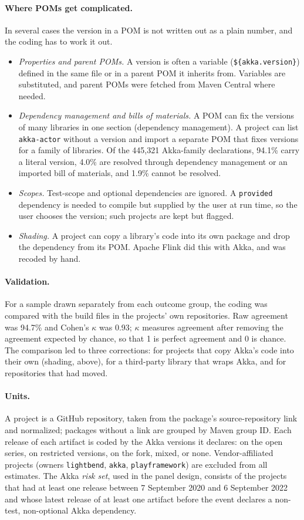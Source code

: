 \documentclass[11pt]{article}
\begin{document}
\paragraph{Where POMs get complicated.} In several cases the version in a POM is not written out as a plain number, and the coding has to work it out.
\begin{itemize}\itemsep1pt
\item \emph{Properties and parent POMs.} A version is often a variable (\texttt{\$\{akka.version\}}) defined in the same file or in a parent POM it inherits from. Variables are substituted, and parent POMs were fetched from Maven Central where needed.
\item \emph{Dependency management and bills of materials.} A POM can fix the versions of many libraries in one section (dependency management). A project can list \texttt{akka-actor} without a version and import a separate POM that fixes versions for a family of libraries. Of the 445,321 Akka-family declarations, 94.1\% carry a literal version, 4.0\% are resolved through dependency management or an imported bill of materials, and 1.9\% cannot be resolved.
\item \emph{Scopes.} Test-scope and optional dependencies are ignored. A \texttt{provided} dependency is needed to compile but supplied by the user at run time, so the user chooses the version; such projects are kept but flagged.
\item \emph{Shading.} A project can copy a library's code into its own package and drop the dependency from its POM. Apache Flink did this with Akka, and was recoded by hand.
\end{itemize}

\paragraph{Validation.} For a sample drawn separately from each outcome group, the coding was compared with the build files in the projects' own repositories. Raw agreement was 94.7\% and Cohen's $\kappa$ was 0.93; $\kappa$ measures agreement after removing the agreement expected by chance, so that 1 is perfect agreement and 0 is chance. The comparison led to three corrections: for projects that copy Akka's code into their own (shading, above), for a third-party library that wraps Akka, and for repositories that had moved.

\paragraph{Units.} A project is a GitHub repository, taken from the package's source-repository link and normalized; packages without a link are grouped by Maven group ID. Each release of each artifact is coded by the Akka versions it declares: on the open series, on restricted versions, on the fork, mixed, or none. Vendor-affiliated projects (owners \texttt{lightbend}, \texttt{akka}, \texttt{playframework}) are excluded from all estimates. The Akka \emph{risk set}, used in the panel design, consists of the projects that had at least one release between 7 September 2020 and 6 September 2022 and whose latest release of at least one artifact before the event declares a non-test, non-optional Akka dependency.
\end{document}
